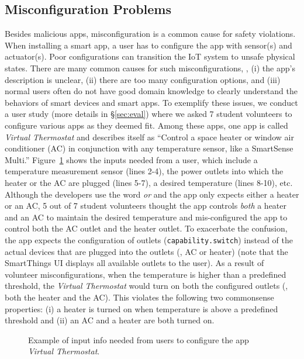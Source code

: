 \subsection{Misconfiguration Problems} Besides malicious apps, misconfiguration is a common cause for safety violations.
When installing a smart app, a user has
to configure the app with sensor(s) and actuator(s). Poor configurations
can transition the IoT system to unsafe physical states.
There are many common causes for such misconfigurations, \eg,
(i) the app's description is unclear,
(ii) there are too many configuration options,
and (iii) normal users often do not have good domain knowledge to
clearly understand the behaviors of smart devices and smart apps.
To exemplify these issues, we conduct a user study (more details in \S\ref{sec:eval})
where we asked 7 student volunteers to configure various apps as they deemed fit.
Among these apps, one app is called \textit{Virtual Thermostat} and describes itself as
``Control a space heater or window air conditioner (AC) in conjunction with any temperature sensor, like a SmartSense Multi.''
{\color{black}Figure~\ref{inputexample} shows the inputs needed from a user,
which include a temperature measurement sensor (lines 2-4),
the power outlets into which the heater or the AC are plugged (lines 5-7),
a desired temperature (lines 8-10), etc.}
Although the developers use the word {\em or} and the app only expects
either a heater or an AC,
5 out of 7 student volunteers thought the app controls {\em both}
a heater and an AC to maintain the desired temperature and
mis-configured the app to control both the AC outlet and the heater outlet.
To exacerbate the confusion, the app expects
the configuration of outlets (\texttt{capability.switch})
instead of the actual devices that are plugged into the outlets
(\ie, AC or heater) (note that the SmartThings UI displays all available outlets to the user).
As a result of volunteer misconfigurations, when the temperature is higher than a predefined threshold,
the \textit{Virtual Thermostat} would turn on both the configured outlets
(\ie, both the heater and the AC).
This violates the following two commonsense properties:
(i) a heater is turned on when temperature is above a predefined threshold and
(ii) an AC and a heater are both turned on.

\begin{figure}[tb]
\begin{center}
\ssp

\caption{{\color{black}Example of input info needed from users to configure the app \textit{Virtual Thermostat}.}}
\label{inputexample}
\end{center}
\end{figure}

